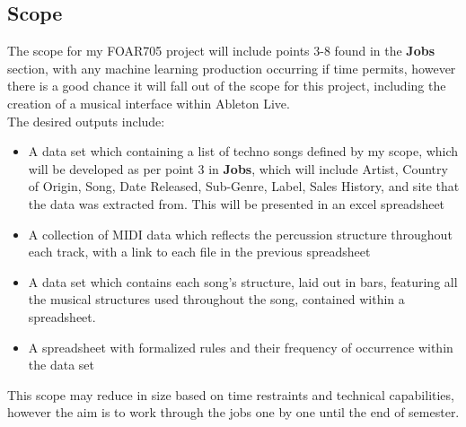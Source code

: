 \documentclass{article}
\begin{document}
\subsection{Scope}
The scope for my FOAR705 project will include points 3-8 found in the \textbf{Jobs} section, with any machine learning production occurring if time permits, however there is a good chance it will fall out of the scope for this project, including the creation of a musical interface within Ableton Live. \\
The desired outputs include:
\begin{itemize}
    \item A data set which containing a list of techno songs defined by my scope, which will be developed as per point 3 in \textbf{Jobs}, which will include Artist, Country of Origin, Song, Date Released, Sub-Genre, Label, Sales History, and site that the data was extracted from. This will be presented in an excel spreadsheet
    \item A collection of MIDI data which reflects the percussion structure throughout each track, with a link to each file in the previous spreadsheet
    \item A data set which contains each song's structure, laid out in bars, featuring all the musical structures used throughout the song, contained within a spreadsheet.
    \item A spreadsheet with formalized rules and their frequency of occurrence within the data set 
\end{itemize}
This scope may reduce in size based on time restraints and technical capabilities, however the aim is to work through the jobs one by one until the end of semester.
\end{document}
